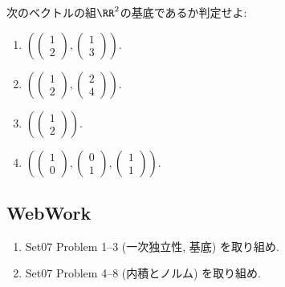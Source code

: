 \begin{quiz}
  次のベクトルの組$\RR^2$の基底であるか判定せよ:
  \begin{enumerate}
    \item $(\begin{pmatrix}1\\2\end{pmatrix},\begin{pmatrix}1\\3\end{pmatrix})$.
    \item $(\begin{pmatrix}1\\2\end{pmatrix},\begin{pmatrix}2\\4\end{pmatrix})$.
    \item $(\begin{pmatrix}1\\2\end{pmatrix})$.
    \item $(\begin{pmatrix}1\\0\end{pmatrix},\begin{pmatrix}0\\1\end{pmatrix},\begin{pmatrix}1\\1\end{pmatrix})$.
  \end{enumerate}
\end{quiz}


\subsection{WebWork}
\begin{enumerate}
  \item Set07 Problem 1--3 (一次独立性, 基底) を取り組め.
  \item Set07 Problem 4--8 (内積とノルム) を取り組め.
\end{enumerate}

\endinput
\newpage
\section{10/15回目: \schoolCalender{10}}
\subsection{問題}
\begin{quiz}
\end{quiz}
